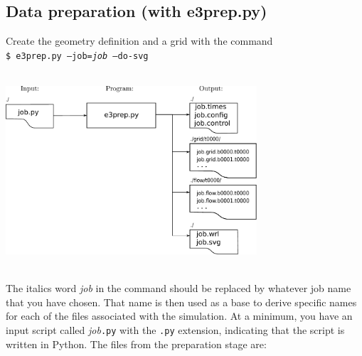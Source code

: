 \subsection{Data preparation (with e3prep.py)}
Create the geometry definition and a grid with the command\\
         \texttt{\$ e3prep.py --job=\textit{job} --do-svg }\\ 
         \vspace{0.25cm} \\
         \centerline{\includegraphics[width=0.7\textwidth]{figs/preparation.pdf}}\\
         The italics word \textit{job} in the command should be replaced 
         by whatever job name that you have chosen.
         That name is then used as a base to derive specific names for each of
         the files associated with the simulation.
         At a minimum, you have an input script called \textit{job}\texttt{.py} 
         with the \texttt{.py} extension, indicating that the script is written in Python.
         The files from the preparation stage are:
